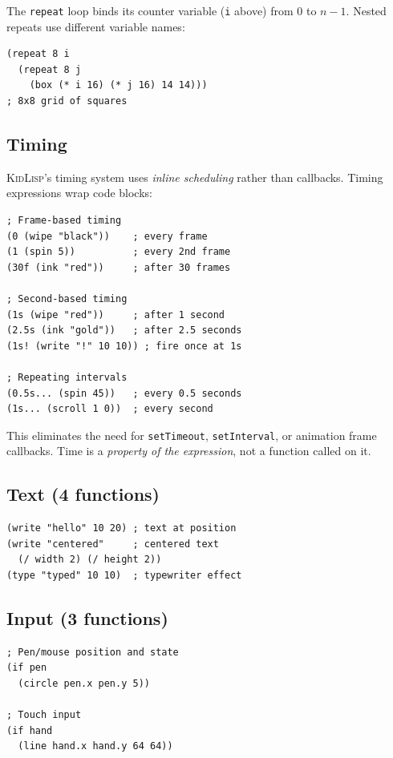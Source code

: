 \documentclass[10pt,letterpaper,twocolumn]{article}
\newcommand{\kl}{\textsc{KidLisp}}
\begin{document}
The \texttt{repeat} loop binds its counter variable (\texttt{i} above) from 0 to $n-1$. Nested repeats use different variable names:

\begin{lstlisting}
(repeat 8 i
  (repeat 8 j
    (box (* i 16) (* j 16) 14 14)))
; 8x8 grid of squares
\end{lstlisting}

\subsection{Timing}

\kl{}'s timing system uses \emph{inline scheduling} rather than callbacks. Timing expressions wrap code blocks:

\begin{lstlisting}
; Frame-based timing
(0 (wipe "black"))    ; every frame
(1 (spin 5))          ; every 2nd frame
(30f (ink "red"))     ; after 30 frames

; Second-based timing
(1s (wipe "red"))     ; after 1 second
(2.5s (ink "gold"))   ; after 2.5 seconds
(1s! (write "!" 10 10)) ; fire once at 1s

; Repeating intervals
(0.5s... (spin 45))   ; every 0.5 seconds
(1s... (scroll 1 0))  ; every second
\end{lstlisting}

This eliminates the need for \texttt{setTimeout}, \texttt{setInterval}, or animation frame callbacks. Time is a \emph{property of the expression}, not a function called on it.

\subsection{Text (4 functions)}

\begin{lstlisting}
(write "hello" 10 20) ; text at position
(write "centered"     ; centered text
  (/ width 2) (/ height 2))
(type "typed" 10 10)  ; typewriter effect
\end{lstlisting}

\subsection{Input (3 functions)}

\begin{lstlisting}
; Pen/mouse position and state
(if pen
  (circle pen.x pen.y 5))

; Touch input
(if hand
  (line hand.x hand.y 64 64))
\end{lstlisting}
\end{document}
